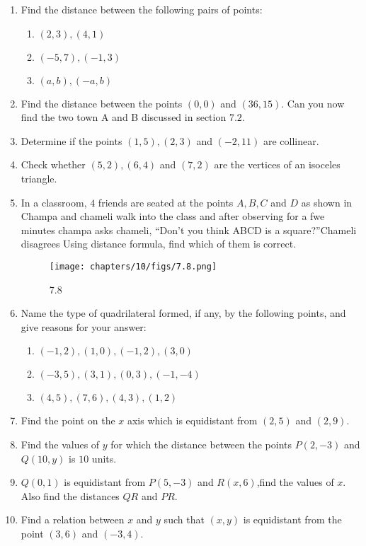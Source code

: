 \begin{enumerate}
\item Find the distance between the following pairs of points:
\begin{enumerate}[label=(\roman*)]
\item $(2,3), (4,1)$
\item $(-5,7), (-1,3)$
\item $(a,b), (-a,b)$
\end{enumerate}
\item Find the distance between the points $(0,0)$ and $(36,15)$. Can you now find the two town A and B discussed in section $7.2$.
\item Determine if the points $(1,5), (2,3)$ and $(-2,11)$ are collinear.
\item Check whether $(5,2), (6,4)$ and $(7,2)$ are the vertices of an isoceles triangle.
\item In a classroom, $4$ friends are seated at the points $A, B, C$ and $D$ as shown  in  Champa and chameli walk into the class and  after observing for a fwe minutes champa asks chameli, \textquotedblleft Don't you think ABCD is a square?\textquotedblright  Chameli disagrees Using distance formula, find which of them is correct.
	\begin{figure}[ht]
\centering
\texttt{[image: chapters/10/figs/7.8.png]}
\caption{7.8}
  \label{fig:7.8}
\end{figure}
\item Name the type of quadrilateral formed, if any, by the following points, and give reasons for your answer:
\begin{enumerate}[label=(\roman*)]
\item $(-1,2), (1,0), (-1,2), (3,0)$
\item $(-3,5), (3,1), (0,3), (-1,-4)$
\item $(4,5), (7,6), (4,3), (1,2)$
\end{enumerate}
\item Find the point on the $x$ axis which is equidistant from $(2,5)$ and $(2,9)$. 
\item Find the values of $y$ for which the distance between the points $P(2,-3)$ and $Q(10,y)$ is $10$ units.
\item $Q(0,1)$ is equidistant from $P(5,-3)$ and $R(x,6)$,find the values of $x$. Also find the distances $QR$ and $PR$.
\item Find a relation  between $x$ and $y$ such that $(x,y)$ is equidistant from the point $(3,6)$ and $(-3,4)$.
\end{enumerate}
	

